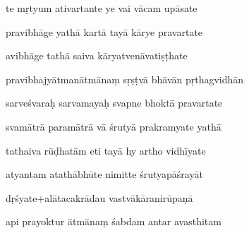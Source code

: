 \documentclass[article,12pt,a4paper]{memoir}%
\newcounter{parCount}
\begin{document}
	  
	  \pstart \leavevmode%
	te mṛtyum ativartante ye vai vācam upāsate 
	{}
	\pend%
      

	  
	  \pstart {} pravibhāge yathā kartā tayā kārye pravartate 
	{}
	\pend%
      

	  
	  \pstart \leavevmode%
	avibhāge tathā saiva kāryatvenāvatiṣṭhate 
	{}
	\pend%
      

	  
	  \pstart {} pravibhajyātmanātmānaṃ sṛṣṭvā bhāvān pṛthagvidhān 
	{}
	\pend%
      

	  
	  \pstart \leavevmode%
	sarveśvaraḥ sarvamayaḥ svapne bhoktā pravartate 
	{}
	\pend%
      

	  
	  \pstart {} svamātrā paramātrā vā śrutyā prakramyate yathā 
	{}
	\pend%
      

	  
	  \pstart \leavevmode%
	tathaiva rūḍhatām eti tayā hy artho vidhīyate 
	{}
	\pend%
      

	  
	  \pstart {} atyantam atathābhūte nimitte śrutyapāśrayāt 
	{}
	\pend%
      

	  
	  \pstart \leavevmode%
	dṛśyate+alātacakrādau vastvākāranirūpaṇā 
	{}
	\pend%
      

	  
	  \pstart {} api prayoktur ātmānaṃ śabdam antar avasthitam 
	{}
	\pend%
      
\end{document}
